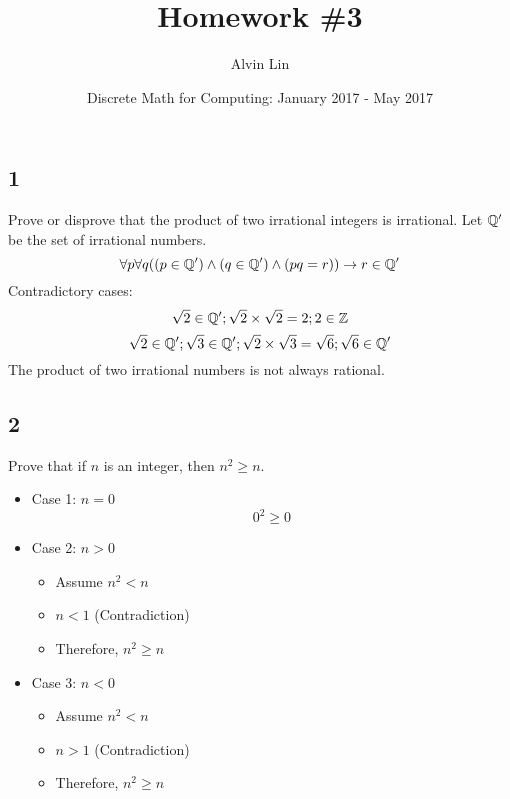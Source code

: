 \documentclass[letterpaper, 12pt]{math}
\title{Homework \#3}
\author{Alvin Lin}
\date{Discrete Math for Computing: January 2017 - May 2017}
\begin{document}
\maketitle

\subsection*{1}
Prove or disprove that the product of two irrational integers is irrational.
Let \( \mathbb{Q'} \) be the set of irrational numbers.
\[ \forall{p}\forall{q}((p\in\mathbb{Q'})\wedge(q\in\mathbb{Q'})\wedge(pq = r))\to r\in\mathbb{Q'} \]
Contradictory cases:
\[ \sqrt{2}\in\mathbb{Q'}; \sqrt{2}\times\sqrt{2} = 2; 2\in\mathbb{Z} \]
\[ \sqrt{2}\in\mathbb{Q'}; \sqrt{3}\in\mathbb{Q'}; \sqrt{2}\times\sqrt{3} = \sqrt{6};
   \sqrt{6}\in\mathbb{Q'} \]
The product of two irrational numbers is not always rational.

\subsection*{2}
Prove that if \( n \) is an integer, then \( n^{2} \geq n \).
\begin{itemize}
  \item Case 1: \( n = 0 \)
    \[ 0^{2} \geq 0 \]
  \item Case 2: \( n > 0 \)
    \begin{itemize}
      \item Assume \( n^{2} < n \)
      \item \( n < 1 \) (Contradiction)
      \item Therefore, \( n^{2} \geq n \)
    \end{itemize}
  \item Case 3: \( n < 0 \)
    \begin{itemize}
      \item Assume \( n^{2} < n \)
      \item \( n > 1 \) (Contradiction)
      \item Therefore, \( n^{2} \geq n \)
    \end{itemize}
\end{itemize}
\end{document}
